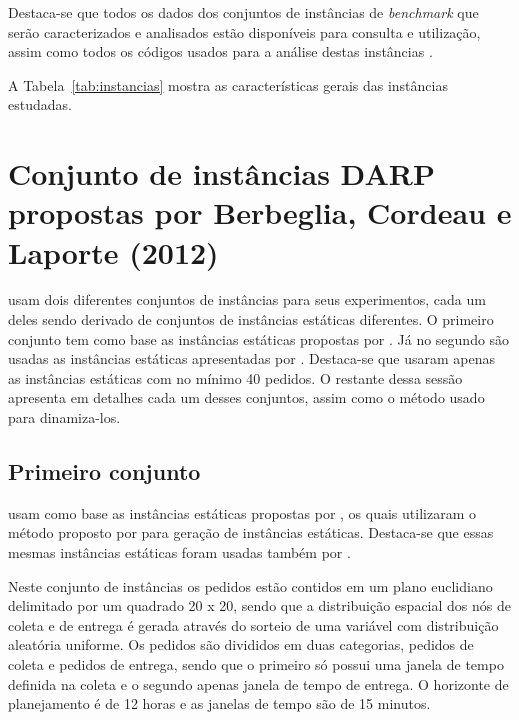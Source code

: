 Destaca-se que todos os dados dos conjuntos de instâncias de \textit{benchmark}
que serão caracterizados e analisados estão disponíveis para consulta e
utilização, assim como todos os códigos usados para a análise destas
instâncias \cite{eccel_problemas_2019}.

A Tabela~\ref{tab:instancias} mostra as características gerais das instâncias
estudadas.


% 






\section{Conjunto de instâncias DARP propostas por 
         Berbeglia, Cordeau e Laporte (2012)}
\label{sec:instances_berbeglia}

\textcite{berbeglia_hybrid_tabu_2012} usam dois diferentes conjuntos de 
instâncias para seus experimentos, cada um deles sendo derivado de conjuntos 
de instâncias estáticas diferentes.
O primeiro conjunto tem como base as instâncias estáticas propostas por 
\textcite{ropke_models_2007}.
Já no segundo são usadas as instâncias estáticas apresentadas por
\textcite{cordeau_tabu_2003}.
Destaca-se que \textcite{berbeglia_hybrid_tabu_2012} usaram apenas as 
instâncias estáticas com no mínimo 40 pedidos.
O restante dessa sessão apresenta em detalhes cada um desses conjuntos, assim
como o método usado para dinamiza-los.

\subsection{Primeiro conjunto}\label{sec:instances_berbeglia_1}
\textcite{berbeglia_hybrid_tabu_2012} usam como base as instâncias estáticas 
propostas por \textcite{ropke_models_2007}, os quais utilizaram o método 
proposto por \textcite{savelsbergh_drive:_1998} para geração de instâncias 
estáticas.
Destaca-se que essas mesmas instâncias estáticas foram usadas também por
\textcite{cordeau_branch-and-cut_2006}.

Neste conjunto de instâncias os pedidos estão contidos em um plano euclidiano
delimitado por um quadrado 20 x 20, sendo que a distribuição espacial dos
nós de coleta e de entrega é gerada através do sorteio de uma variável com 
distribuição aleatória uniforme.
Os pedidos são divididos em duas categorias, pedidos de coleta e pedidos de
entrega, sendo que o primeiro só possui uma janela de tempo definida na coleta 
e o segundo apenas janela de tempo de entrega.
O horizonte de planejamento é de 12 horas e as janelas de tempo são de 15
minutos.

